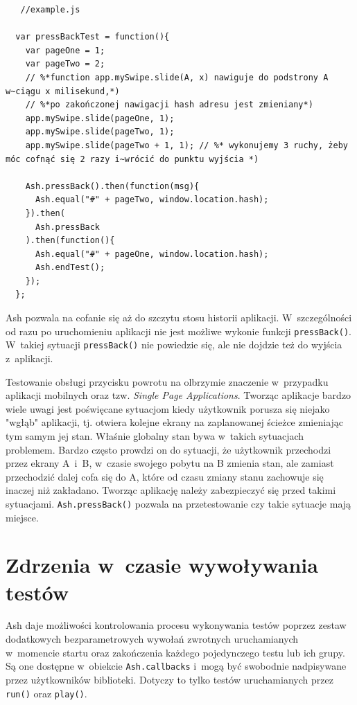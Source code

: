 \documentclass[brudnopis]{xmgr}
\begin{document}
\begin{lstlisting}
   //example.js

  var pressBackTest = function(){
    var pageOne = 1;
    var pageTwo = 2;
    // %*function app.mySwipe.slide(A, x) nawiguje do podstrony A w~ciągu x milisekund,*)
    // %*po zakończonej nawigacji hash adresu jest zmieniany*)
    app.mySwipe.slide(pageOne, 1); 
    app.mySwipe.slide(pageTwo, 1); 
    app.mySwipe.slide(pageTwo + 1, 1); // %* wykonujemy 3 ruchy, żeby móc cofnąć się 2 razy i~wrócić do punktu wyjścia *)
    
    Ash.pressBack().then(function(msg){
      Ash.equal("#" + pageTwo, window.location.hash);
    }).then(
      Ash.pressBack
    ).then(function(){
      Ash.equal("#" + pageOne, window.location.hash);
      Ash.endTest();
    });
  };
\end{lstlisting}

Ash pozwala na cofanie się aż do szczytu stosu historii aplikacji. W~szczególności od razu po uruchomieniu aplikacji nie jest możliwe wykonie funkcji \texttt{pressBack()}. W~takiej sytuacji \texttt{pressBack()} nie powiedzie się, ale nie dojdzie też do wyjścia z~aplikacji.

Testowanie obsługi przycisku powrotu na olbrzymie znaczenie w~przypadku aplikacji mobilnych oraz tzw. \textit{Single Page Applications}. Tworząc aplikacje bardzo wiele uwagi jest poświęcane sytuacjom kiedy użytkownik porusza się niejako "wgłąb" aplikacji, tj. otwiera kolejne ekrany na zaplanowanej ścieżce zmieniając tym samym jej stan.  Właśnie globalny stan bywa w~takich sytuacjach problemem. Bardzo często prowdzi on do sytuacji, że użytkownik przechodzi przez ekrany A~i~B, w~czasie swojego pobytu na B zmienia stan, ale zamiast przechodzić dalej cofa się do A, które od czasu zmiany stanu zachowuje się inaczej niż zakładano. Tworząc aplikację należy zabezpieczyć się przed takimi sytuacjami. \texttt{Ash.pressBack()} pozwala na przetestowanie czy takie sytuacje mają miejsce. 

\section{Zdrzenia w~czasie wywoływania testów}

Ash daje możliwości kontrolowania procesu wykonywania testów poprzez zestaw dodatkowych bezparametrowych wywołań zwrotnych uruchamianych w~momencie startu oraz zakończenia każdego pojedynczego testu lub ich grupy. Są one dostępne w~obiekcie \texttt{Ash.callbacks} i~mogą być swobodnie nadpisywane przez użytkowników biblioteki. Dotyczy to tylko testów uruchamianych przez \texttt{run()} oraz \texttt{play()}.
\end{document}
